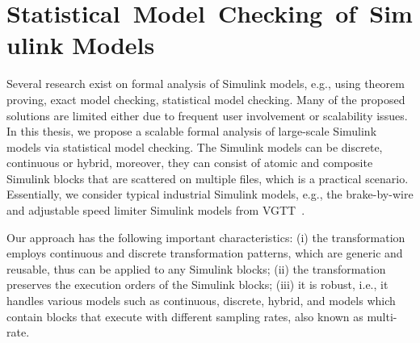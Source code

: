 \section{Statistical~Model~Checking~of~Simulink Models}\label{rc_sim}
Several research exist on formal analysis of Simulink models, e.g., using theorem proving, exact model checking, statistical model checking. Many of the proposed solutions are  limited either due to frequent user involvement or scalability issues. In this thesis, we propose a scalable formal analysis of large-scale Simulink models via statistical model checking. The Simulink models can be discrete, continuous or hybrid, moreover, they can consist of atomic and composite Simulink blocks that are scattered on multiple files, which is a practical scenario. Essentially, we consider typical industrial Simulink models, e.g., the brake-by-wire and adjustable speed limiter Simulink models from VGTT~\cite{Filipovikj2018SimppaalModels}.

Our approach has the following important characteristics: (i) the transformation employs continuous and discrete transformation patterns, which are generic and reusable, thus can be applied to any Simulink blocks; (ii) the transformation preserves the execution orders of the Simulink blocks; (iii) it is robust, i.e., it handles various models such as continuous, discrete, hybrid, and models which contain blocks that execute with different sampling rates, also known as multi-rate.

